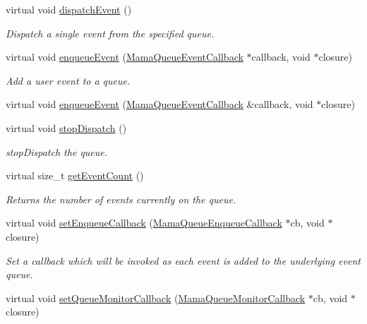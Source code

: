 \begin{DoxyCompactItemize}
virtual void \hyperlink{classWombat_1_1MamaQueue_aa173a08f81436cb9da85adf4ce9e570a}{dispatchEvent} ()
\begin{DoxyCompactList}\small\item\em Dispatch a single event from the specified queue. \item\end{DoxyCompactList}\item 
virtual void \hyperlink{classWombat_1_1MamaQueue_a8b1a038741f3d3c5cd3bcea8708003c7}{enqueueEvent} (\hyperlink{classWombat_1_1MamaQueueEventCallback}{MamaQueueEventCallback} $\ast$callback, void $\ast$closure)
\begin{DoxyCompactList}\small\item\em Add a user event to a queue. \item\end{DoxyCompactList}\item 
virtual void \hyperlink{classWombat_1_1MamaQueue_af136b615d84a68935e875a3c857a5825}{enqueueEvent} (\hyperlink{classWombat_1_1MamaQueueEventCallback}{MamaQueueEventCallback} \&callback, void $\ast$closure)
\item 
virtual void \hyperlink{classWombat_1_1MamaQueue_ac5cc7a2954404933c0700b6bea16844a}{stopDispatch} ()
\begin{DoxyCompactList}\small\item\em stopDispatch the queue. \item\end{DoxyCompactList}\item 
virtual size\_\-t \hyperlink{classWombat_1_1MamaQueue_adccba195eae12f648ab5afcd0db14d0c}{getEventCount} ()
\begin{DoxyCompactList}\small\item\em Returns the number of events currently on the queue. \item\end{DoxyCompactList}\item 
virtual void \hyperlink{classWombat_1_1MamaQueue_a852c925667c07e8bd0b3bc8cf30f4986}{setEnqueueCallback} (\hyperlink{classWombat_1_1MamaQueueEnqueueCallback}{MamaQueueEnqueueCallback} $\ast$cb, void $\ast$closure)
\begin{DoxyCompactList}\small\item\em Set a callback which will be invoked as each event is added to the underlying event queue. \item\end{DoxyCompactList}\item 
virtual void \hyperlink{classWombat_1_1MamaQueue_a93d4b30ff2f99b071a2d873653381569}{setQueueMonitorCallback} (\hyperlink{classWombat_1_1MamaQueueMonitorCallback}{MamaQueueMonitorCallback} $\ast$cb, void $\ast$closure)

\end{DoxyCompactItemize}
